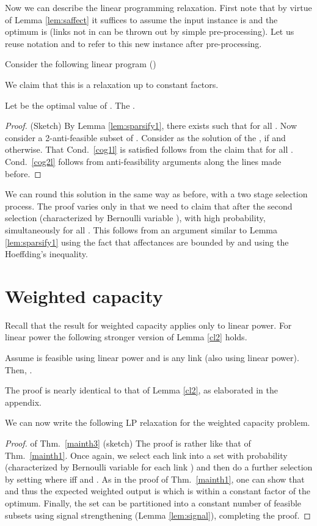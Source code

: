 \documentclass[11pt]{amsart}
\begin{document}
Now we can describe the linear programming relaxation. First note that by virtue of Lemma \ref{lem:saffect} it suffices to  assume the input instance is  and the optimum is  (links not in  can be thrown out by simple pre-processing). 
Let us reuse notation  and  to refer to this new instance after pre-processing.

Consider the following linear program ()

We claim that this is a relaxation up to constant factors.
\begin{lemma}
Let  be the optimal value of . The .
\end{lemma}
\begin{proof}{(Sketch)}
By Lemma \ref{lem:sparsify1}, there exists   such that  for all . Now consider
a 2-anti-feasible subset  of . Consider as the solution of the
,  if  and 
otherwise. That Cond.\ \ref{cog1l} is satisfied follows from the claim
that  for all . Cond.\ \ref{cog2l} follows from anti-feasibility arguments along the lines made before.
\end{proof}


We can round this solution in the same way as before, with a two stage selection process. The proof varies only in that we need to claim that after the second
selection (characterized by Bernoulli variable ),  with high probability, simultaneously for all .
This  follows from an argument similar to Lemma \ref{lem:sparsify1} using the fact that affectances are bounded by  and using the Hoeffding's inequality.


\section{Weighted capacity}
\label{sec:weighted}
Recall that the result for weighted capacity applies only to linear power. For linear power the following stronger version of Lemma \ref{cl2} holds.

\begin{lemma}
Assume  is feasible using linear power and  is any link (also using linear power). Then, .
\label{cl4}
\end{lemma}
The proof is nearly identical to that of Lemma \ref{cl2}, as elaborated
in the appendix.


We can now write the following LP relaxation for the weighted capacity problem.




\begin{proof}{of Thm.~\ref{mainth3} (sketch)}
The proof is rather like that of Thm.~\ref{mainth1}. Once again, we select each link into a set  with probability  (characterized by Bernoulli variable  for each link ) and then do a further selection by setting  where  iff  and . As in the proof of Thm.~\ref{mainth1}, one can show that  and thus the expected weighted output is  which is within a constant factor of the optimum. Finally, the set  can be partitioned into a constant number of
feasible subsets using signal strengthening (Lemma \ref{lem:signal}), completing the proof.
\end{proof}
\end{document}
